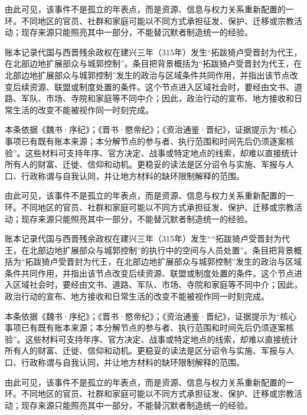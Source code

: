 由此可见，该事件不是孤立的年表点，而是资源、信息与权力关系重新配置的一环。不同地区的官员、社群和家庭可能以不同方式承担征发、保护、迁移或宗教活动；现存来源只能照亮其中一部分，不能替沉默者制造统一的经验。

账本记录代国与西晋残余政权在建兴三年（315年）发生“拓跋猗卢受晋封为代王，在北部边地扩展部众与城郭控制”。条目把背景概括为“拓跋猗卢受晋封为代王，在北部边地扩展部众与城郭控制”发生的政治与区域条件共同作用，并指出该节点改变后续资源、联盟或制度处置的条件。这个节点进入区域社会时，要经由文书、道路、军队、市场、寺院和家庭等不同中介；因此，政治行动的宣布、地方接收和日常生活的改变不能被视作同一时刻完成。

本条依据《魏书·序纪》；《晋书·愍帝纪》；《资治通鉴·晋纪》，证据提示为“核心事项已有既有账本来源；本分解节点的参与者、执行范围和时间先后仍须逐案核验”。这些材料可支持年序、官方决定、战事或特定地点的线索，却难以直接统计所有人的财富、迁徙、信仰和动机。更稳妥的读法是区分诏令与实施、军报与人口、行政称谓与自我认同，并让地方材料的缺环限制解释的范围。

由此可见，该事件不是孤立的年表点，而是资源、信息与权力关系重新配置的一环。不同地区的官员、社群和家庭可能以不同方式承担征发、保护、迁移或宗教活动；现存来源只能照亮其中一部分，不能替沉默者制造统一的经验。

账本记录代国与西晋残余政权在建兴三年（315年）发生““拓跋猗卢受晋封为代王，在北部边地扩展部众与城郭控制”的执行中的空间与人员处置”。条目把背景概括为“拓跋猗卢受晋封为代王，在北部边地扩展部众与城郭控制”发生的政治与区域条件共同作用，并指出该节点改变后续资源、联盟或制度处置的条件。这个节点进入区域社会时，要经由文书、道路、军队、市场、寺院和家庭等不同中介；因此，政治行动的宣布、地方接收和日常生活的改变不能被视作同一时刻完成。

本条依据《魏书·序纪》；《晋书·愍帝纪》；《资治通鉴·晋纪》，证据提示为“核心事项已有既有账本来源；本分解节点的参与者、执行范围和时间先后仍须逐案核验”。这些材料可支持年序、官方决定、战事或特定地点的线索，却难以直接统计所有人的财富、迁徙、信仰和动机。更稳妥的读法是区分诏令与实施、军报与人口、行政称谓与自我认同，并让地方材料的缺环限制解释的范围。

由此可见，该事件不是孤立的年表点，而是资源、信息与权力关系重新配置的一环。不同地区的官员、社群和家庭可能以不同方式承担征发、保护、迁移或宗教活动；现存来源只能照亮其中一部分，不能替沉默者制造统一的经验。

